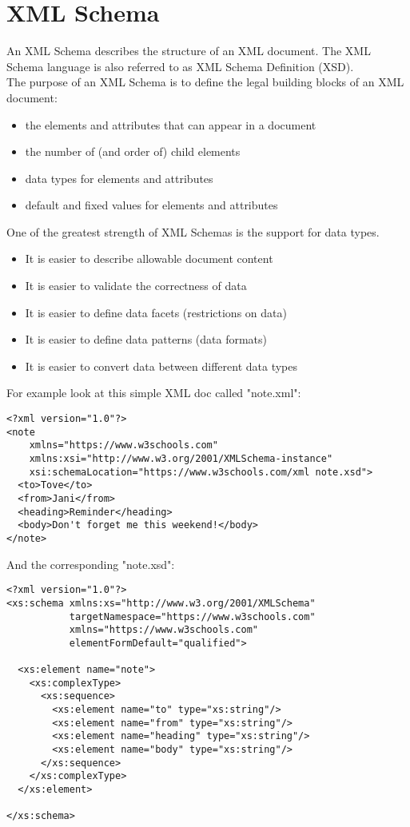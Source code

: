 \documentclass[11pt]{article}
\begin{document}
\section{XML Schema}
\label{sec:orged73bbf}
An XML Schema describes the structure of an XML document. The XML Schema language is also referred to as XML Schema Definition (XSD).\\
The purpose of an XML Schema is to define the legal building blocks of an XML document:
\begin{itemize}
\item the elements and attributes that can appear in a document
\item the number of (and order of) child elements
\item data types for elements and attributes
\item default and fixed values for elements and attributes
\end{itemize}
One of the greatest strength of XML Schemas is the support for data types.
\begin{itemize}
\item It is easier to describe allowable document content
\item It is easier to validate the correctness of data
\item It is easier to define data facets (restrictions on data)
\item It is easier to define data patterns (data formats)
\item It is easier to convert data between different data types
\end{itemize}
For example look at this simple XML doc called "note.xml":
\lstset{breaklines=true,language=XML,label= ,caption= ,captionpos=b,numbers=none}
\begin{lstlisting}
<?xml version="1.0"?>
<note
    xmlns="https://www.w3schools.com"
    xmlns:xsi="http://www.w3.org/2001/XMLSchema-instance"
    xsi:schemaLocation="https://www.w3schools.com/xml note.xsd">
  <to>Tove</to>
  <from>Jani</from>
  <heading>Reminder</heading>
  <body>Don't forget me this weekend!</body>
</note>
\end{lstlisting}
And the corresponding "note.xsd":
\lstset{breaklines=true,language=XML,label= ,caption= ,captionpos=b,numbers=none}
\begin{lstlisting}
<?xml version="1.0"?>
<xs:schema xmlns:xs="http://www.w3.org/2001/XMLSchema"
           targetNamespace="https://www.w3schools.com"
           xmlns="https://www.w3schools.com"
           elementFormDefault="qualified">

  <xs:element name="note">
    <xs:complexType>
      <xs:sequence>
        <xs:element name="to" type="xs:string"/>
        <xs:element name="from" type="xs:string"/>
        <xs:element name="heading" type="xs:string"/>
        <xs:element name="body" type="xs:string"/>
      </xs:sequence>
    </xs:complexType>
  </xs:element>

</xs:schema>
\end{lstlisting}
\end{document}
